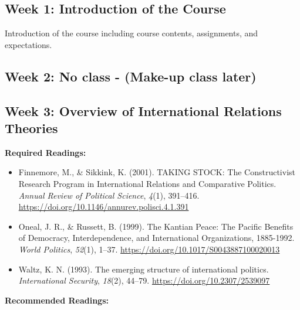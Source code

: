 \documentclass[
  letterpaper,
  DIV=11,
  numbers=noendperiod]{scrartcl}
\providecommand{\tightlist}{%
  \setlength{\itemsep}{0pt}\setlength{\parskip}{0pt}}\usepackage{longtable,booktabs,array}
\begin{document}
\hypertarget{week-1-introduction-of-the-course}{%
\subsection*{Week 1: Introduction of the
Course}\label{week-1-introduction-of-the-course}}

Introduction of the course including course contents, assignments, and
expectations.

\hypertarget{week-2-no-class---make-up-class-later}{%
\subsection*{Week 2: No class - (Make-up class
later)}\label{week-2-no-class---make-up-class-later}}

\hypertarget{week-3-overview-of-international-relations-theories}{%
\subsection*{Week 3: Overview of International Relations
Theories}\label{week-3-overview-of-international-relations-theories}}

\textbf{Required Readings:}

\begin{itemize}
\tightlist
\item
  Finnemore, M., \& Sikkink, K. (2001). {TAKING} {STOCK}: {The}
  {Constructivist} {Research} {Program} in {International} {Relations}
  and {Comparative} {Politics}. \emph{Annual Review of Political
  Science}, \emph{4}(1), 391--416.
  \url{https://doi.org/10.1146/annurev.polisci.4.1.391}
\item
  Oneal, J. R., \& Russett, B. (1999). The {Kantian} {Peace}: {The}
  {Pacific} {Benefits} of {Democracy}, {Interdependence}, and
  {International} {Organizations}, 1885-1992. \emph{World Politics},
  \emph{52}(1), 1--37. \url{https://doi.org/10.1017/S0043887100020013}
\item
  Waltz, K. N. (1993). The emerging structure of international politics.
  \emph{International Security}, \emph{18}(2), 44--79.
  \url{https://doi.org/10.2307/2539097}
\end{itemize}

\textbf{Recommended Readings:}
\end{document}
